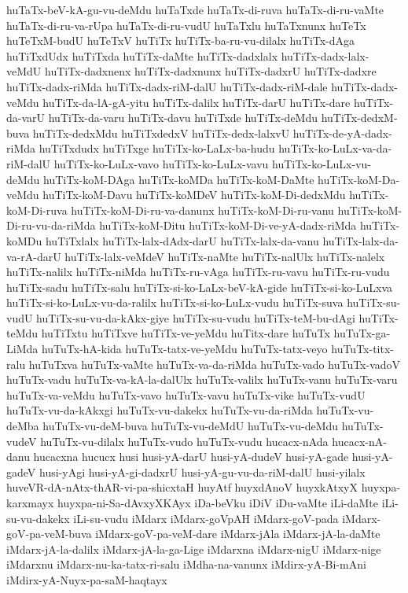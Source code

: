 {huTaTx-beV-kA-gu-vu-deMdu
huTaTxde
huTaTx-di-ruva
huTaTx-di-ru-vaMte
huTaTx-di-ru-va-rUpa
huTaTx-di-ru-vudU
huTaTxlu
huTaTxnunx
huTeTx
huTeTxM-budU
huTeTxV
huTiTx
huTiTx-ba-ru-vu-dilalx
huTiTx-dAga
huTiTxdUdx
huTiTxda
huTiTx-daMte
huTiTx-dadxlalx
huTiTx-dadx-lalx-veMdU
huTiTx-dadxnenx
huTiTx-dadxnunx
huTiTx-dadxrU
huTiTx-dadxre
huTiTx-dadx-riMda
huTiTx-dadx-riM-dalU
huTiTx-dadx-riM-dale
huTiTx-dadx-veMdu
huTiTx-da-lA-gA-yitu
huTiTx-dalilx
huTiTx-darU
huTiTx-dare
huTiTx-da-varU
huTiTx-da-varu
huTiTx-davu
huTiTxde
huTiTx-deMdu
huTiTx-dedxM-buva
huTiTx-dedxMdu
huTiTxdedxV
huTiTx-dedx-lalxvU
huTiTx-de-yA-dadx-riMda
huTiTxdudx
huTiTxge
huTiTx-ko-LaLx-ba-hudu
huTiTx-ko-LuLx-va-da-riM-dalU
huTiTx-ko-LuLx-vavo
huTiTx-ko-LuLx-vavu
huTiTx-ko-LuLx-vu-deMdu
huTiTx-koM-DAga
huTiTx-koMDa
huTiTx-koM-DaMte
huTiTx-koM-Da-veMdu
huTiTx-koM-Davu
huTiTx-koMDeV
huTiTx-koM-Di-dedxMdu
huTiTx-koM-Di-ruva
huTiTx-koM-Di-ru-va-danunx
huTiTx-koM-Di-ru-vanu
huTiTx-koM-Di-ru-vu-da-riMda
huTiTx-koM-Ditu
huTiTx-koM-Di-ve-yA-dadx-riMda
huTiTx-koMDu
huTiTxlalx
huTiTx-lalx-dAdx-darU
huTiTx-lalx-da-vanu
huTiTx-lalx-da-va-rA-darU
huTiTx-lalx-veMdeV
huTiTx-naMte
huTiTx-nalUlx
huTiTx-nalelx
huTiTx-nalilx
huTiTx-niMda
huTiTx-ru-vAga
huTiTx-ru-vavu
huTiTx-ru-vudu
huTiTx-sadu
huTiTx-salu
huTiTx-si-ko-LaLx-beV-kA-gide
huTiTx-si-ko-LuLxva
huTiTx-si-ko-LuLx-vu-da-ralilx
huTiTx-si-ko-LuLx-vudu
huTiTx-suva
huTiTx-su-vudU
huTiTx-su-vu-da-kAkx-giye
huTiTx-su-vudu
huTiTx-teM-bu-dAgi
huTiTx-teMdu
huTiTxtu
huTiTxve
huTiTx-ve-yeMdu
huTitx-dare
huTuTx
huTuTx-ga-LiMda
huTuTx-hA-kida
huTuTx-tatx-ve-yeMdu
huTuTx-tatx-veyo
huTuTx-titx-ralu
huTuTxva
huTuTx-vaMte
huTuTx-va-da-riMda
huTuTx-vado
huTuTx-vadoV
huTuTx-vadu
huTuTx-va-kA-la-dalUlx
huTuTx-valilx
huTuTx-vanu
huTuTx-varu
huTuTx-va-veMdu
huTuTx-vavo
huTuTx-vavu
huTuTx-vike
huTuTx-vudU
huTuTx-vu-da-kAkxgi
huTuTx-vu-dakekx
huTuTx-vu-da-riMda
huTuTx-vu-deMba
huTuTx-vu-deM-buva
huTuTx-vu-deMdU
huTuTx-vu-deMdu
huTuTx-vudeV
huTuTx-vu-dilalx
huTuTx-vudo
huTuTx-vudu
hucacx-nAda
hucacx-nA-danu
hucacxna
hucucx
husi
husi-yA-darU
husi-yA-dudeV
husi-yA-gade
husi-yA-gadeV
husi-yAgi
husi-yA-gi-dadxrU
husi-yA-gu-vu-da-riM-dalU
husi-yilalx
huveVR-dA-nAtx-thAR-vi-pa-shicxtaH
huyAtf
huyxdAnoV
huyxkAtxyX
huyxpa-karxmayx
huyxpa-ni-Sa-dAvxyXKAyx
iDa-beVku
iDiV
iDu-vaMte
iLi-daMte
iLi-su-vu-dakekx
iLi-su-vudu
iMdarx
iMdarx-goVpAH
iMdarx-goV-pada
iMdarx-goV-pa-veM-buva
iMdarx-goV-pa-veM-dare
iMdarx-jAla
iMdarx-jA-la-daMte
iMdarx-jA-la-dalilx
iMdarx-jA-la-ga-Lige
iMdarxna
iMdarx-nigU
iMdarx-nige
iMdarxnu
iMdarx-nu-ka-tatx-ri-salu
iMdha-na-vanunx
iMdirx-yA-Bi-mAni
iMdirx-yA-Nuyx-pa-saM-haqtayx
}
